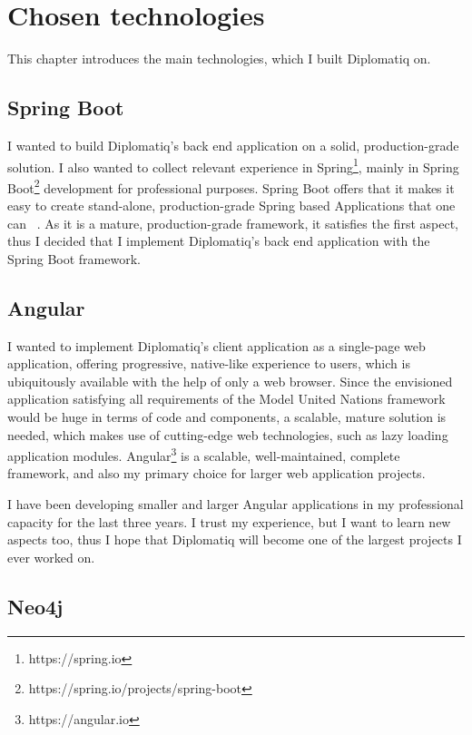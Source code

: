 \chapter{Chosen technologies}
\label{chapter:chosentechnologies}

This chapter introduces the main technologies, which I built Diplomatiq on.

\section{Spring Boot}

I wanted to build Diplomatiq's back end application on a solid, production-grade solution. I also wanted to collect relevant experience in Spring\footnote{https://spring.io}, mainly in Spring Boot\footnote{https://spring.io/projects/spring-boot} development for professional purposes. Spring Boot offers that it makes it easy to create stand-alone, production-grade Spring based Applications that one can ~\cite{spring-boot-reference-docs}. As it is a mature, production-grade framework, it satisfies the first aspect, thus I decided that I implement Diplomatiq's back end application with the Spring Boot framework.

\section{Angular}

I wanted to implement Diplomatiq's client application as a single-page web application, offering progressive, native-like experience to users, which is ubiquitously available with the help of only a web browser. Since the envisioned application satisfying all requirements of the Model United Nations framework would be huge in terms of code and components, a scalable, mature solution is needed, which makes use of cutting-edge web technologies, such as lazy loading application modules. Angular\footnote{https://angular.io} is a scalable, well-maintained, complete framework, and also my primary choice for larger web application projects.

I have been developing smaller and larger Angular applications in my professional capacity for the last three years. I trust my experience, but I want to learn new aspects too, thus I hope that Diplomatiq will become one of the largest projects I ever worked on.

\section{Neo4j}


